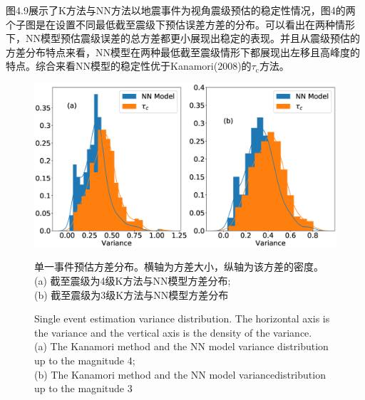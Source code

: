\indent 图4.9展示了K方法与NN方法以地震事件为视角震级预估的稳定性情况，图4的两个子图是在设置不同最低截至震级下预估误差方差的分布。可以看出在两种情形下，NN模型预估震级误差的总方差都更小展现出稳定的表现。并且从震级预估的方差分布特点来看，NN模型在两种最低截至震级情形下都展现出左移且高峰度的特点。综合来看NN模型的稳定性优于Kanamori(2008)的$\tau_{\mathrm{c}}$方法。\\
\begin{figure}[h] 
\centering 
 \includegraphics[width=\linewidth]{img/9.eps} 
 \renewcommand{\figurename}{图} 
\caption{单一事件预估方差分布。横轴为方差大小，纵轴为该方差的密度。\\
(a) 截至震级为4级K方法与NN模型方差分布;\\
(b) 截至震级为3级K方法与NN模型方差分布\\
} 
\addtocounter{figure}{-1} \vspace{-5pt} 
\renewcommand{\figurename}{Fig} 
\caption{Single event estimation variance distribution. The horizontal axis is the variance and the vertical axis is the density of the variance.\\
(a) The Kanamori method and the NN model variance distribution up to the
magnitude 4; \\
(b) The Kanamori method and the NN model variancedistribution up to the magnitude 3} 
\renewcommand{\figurename}{图} 
\label{fig:network-device-influence.png} 
\end{figure}

